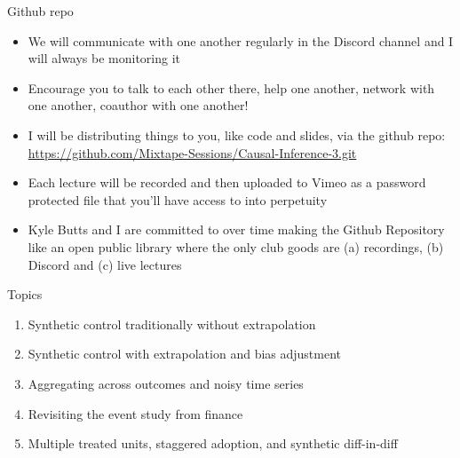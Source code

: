 \documentclass{beamer}
\begin{document}





\begin{frame}{Github repo}

  \begin{itemize}
    \item We will communicate with one another regularly in the Discord channel and I will always be monitoring it
    \item Encourage you to talk to each other there, help one another, network with one another, coauthor with one another!
    \item I will be distributing things to you, like code and slides, via the github repo: \url{https://github.com/Mixtape-Sessions/Causal-Inference-3.git}
    \item Each lecture will be recorded and then uploaded to Vimeo as a password protected file that you'll have access to into perpetuity
    \item Kyle Butts and I are committed to over time making the Github Repository like an open public library where the only club goods are (a) recordings, (b) Discord and (c) live lectures
  \end{itemize}

\end{frame}

\begin{frame}{Topics}

  \begin{enumerate}
    \item Synthetic control traditionally without extrapolation
    \item Synthetic control with extrapolation and bias adjustment
    \item Aggregating across outcomes and noisy time series
    \item Revisiting the event study from finance
    \item Multiple treated units, staggered adoption, and synthetic diff-in-diff
  \end{enumerate}

\end{frame}
\end{document}
